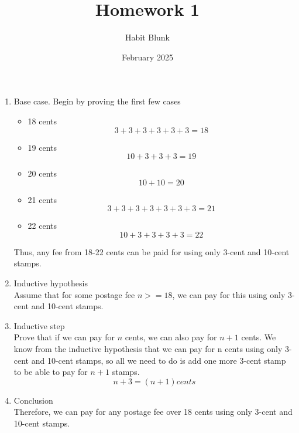 \documentclass{article}
\title{Homework 1}
\author {Habit Blunk}
\date{February 2025}
\begin{document}
\maketitle
\begin{enumerate}
  \item Base case. Begin by proving the first few cases
    \begin{itemize}
      \item 18 cents
        \begin{displaymath}
          3 + 3 + 3 + 3 + 3 + 3 = 18
        \end{displaymath}
      \item 19 cents
        \begin{displaymath}
          10 + 3 + 3 + 3 = 19
        \end{displaymath}
      \item 20 cents
        \begin{displaymath}
          10 + 10 = 20
        \end{displaymath}
      \item 21 cents
        \begin{displaymath}
          3 + 3 + 3 + 3 + 3 + 3 + 3 = 21
        \end{displaymath}
      \item 22 cents
        \begin{displaymath}
          10 + 3 + 3 + 3 + 3 = 22
        \end{displaymath}
    \end{itemize}
    Thus, any fee from 18-22 cents can be paid for using only 3-cent and 10-cent stamps.
  \item Inductive hypothesis\\
    Assume that for some postage fee $ n >= 18 $, we can pay for this using only 3-cent and 10-cent stamps.
  \item Inductive step\\
    Prove that if we can pay for $ n $ cents, we can also pay for $ n + 1 $ cents.
    We know from the inductive hypothesis that we can pay for n cents using only 3-cent and 10-cent stamps, so all we need to do is add one more 3-cent stamp to be able to pay for $ n + 1 $ stamps.
    \begin{displaymath}
      n + 3 = (n + 1) cents
    \end{displaymath}
  \item Conclusion\\
    Therefore, we can pay for any postage fee over 18 cents using only 3-cent and 10-cent stamps.
\end{enumerate}
\end{document}
